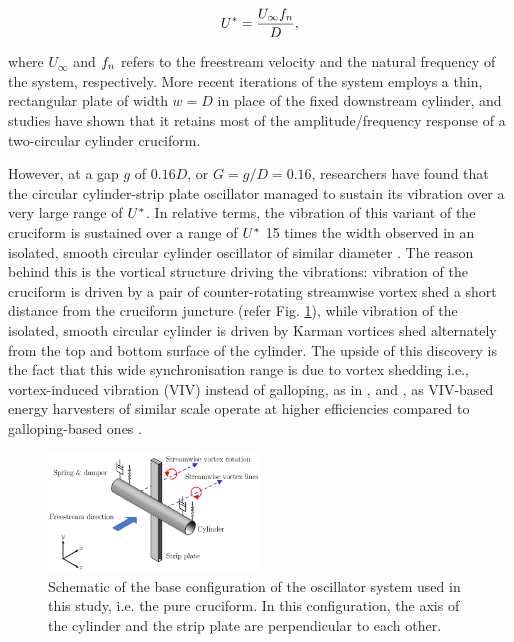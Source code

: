 \documentclass[oneside]{utmthesis}
\begin{document}
\begin{equation}
  U^{*} = \frac{U_{\infty} f_{n}}{D},
  \label{eq:reducedVelocity}
\end{equation}

\noindent where $U_{\infty}$ and $f_{n}$ refers to the freestream velocity and the natural frequency of the system, respectively. More recent iterations of the system employs a thin, rectangular plate of width $w = D$ in place of the fixed downstream cylinder, and studies have shown that it retains most of the amplitude/frequency response of a two-circular cylinder cruciform.

However, at a gap $g$ of $0.16D$, or $G = g/D = 0.16$, researchers have found that the circular cylinder-strip plate oscillator managed to sustain its vibration over a very large range of $U^{*}$. In relative terms, the vibration of this variant of the cruciform is sustained over a range of $U^{*}$ 15 times the width observed in an isolated, smooth circular cylinder oscillator of similar diameter \citep{Koide2009,Koide2013}.
The reason behind this is the vortical structure driving the vibrations: vibration of the cruciform is driven by a pair of counter-rotating streamwise vortex shed a short distance from the cruciform juncture (refer Fig. \ref{fig:oscillatorSchematic}), while vibration of the isolated, smooth circular cylinder is driven by Karman vortices shed alternately from the top and bottom surface of the cylinder.
The upside of this discovery is the fact that this wide synchronisation range is due to vortex shedding i.e., vortex-induced vibration (VIV) instead of galloping, as in \citet{Sun2019b}, \citet{Xu2019} and \citet{Ding2019}, as VIV-based energy harvesters of similar scale operate at higher efficiencies compared to galloping-based ones \citep{Sun2016,Ma2016}.

\begin{figure}
  \centering
  \includegraphics[width=0.5\textwidth]{figs/oscillatorSchematic}
  \caption{Schematic of the base configuration of the oscillator system used in this study, i.e. the pure cruciform. In this configuration, the axis of the cylinder and the strip plate are perpendicular to each other.}
  \label{fig:oscillatorSchematic}
\end{figure}
\end{document}
